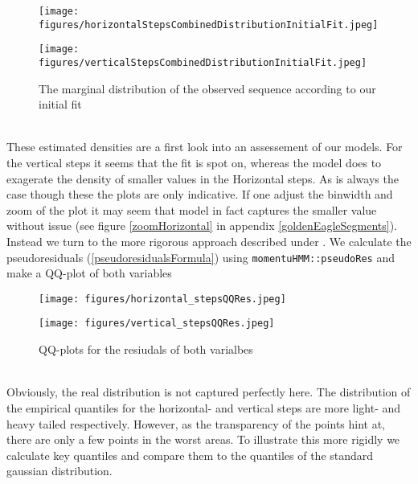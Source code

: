 \begin{figure}[h]
    \centering
    \begin{minipage}[b]{0.49\textwidth}
      \texttt{[image: figures/horizontalStepsCombinedDistributionInitialFit.jpeg]}
    \end{minipage}
    \hfill
    \begin{minipage}[b]{0.49\textwidth}
      \texttt{[image: figures/verticalStepsCombinedDistributionInitialFit.jpeg]}
    \end{minipage}
    \caption{The marginal distribution of the observed sequence according to our initial fit}
    \label{combinedDensityPlotsInitialFit}
\end{figure}\\
These estimated densities are a first look into an assessement of our models. For the vertical steps it seems that the fit is spot on, whereas the model does to exagerate the density of smaller values in the Horizontal steps. As is always the case though these the plots are only indicative. If one adjust the binwidth and zoom of the plot it may seem that model in fact captures the smaller value without issue (see figure \ref{zoomHorizontal} in appendix \ref{goldenEagleSegments}). Instead we turn to the more rigorous approach described under . We calculate the pseudoresiduals (\ref{pseudoresidualsFormula}) using \texttt{momentuHMM::pseudoRes} and make a QQ-plot of both variables
\begin{figure}[h]
    \centering
    \begin{minipage}[b]{0.49\textwidth}
      \texttt{[image: figures/horizontal\_stepsQQRes.jpeg]}
    \end{minipage}
    \hfill
    \begin{minipage}[b]{0.49\textwidth}
      \texttt{[image: figures/vertical\_stepsQQRes.jpeg]}
    \end{minipage}
    \caption{QQ-plots for the resiudals of both varialbes}
    \label{combinedQQPlots}
\end{figure}\\
Obviously, the real distribution is not captured perfectly here. The distribution of the empirical quantiles for the horizontal- and vertical steps are more light- and heavy tailed respectively. However, as the transparency of the points hint at, there are only a few points in the worst areas. To illustrate this more rigidly we calculate key quantiles and compare them to the quantiles of the standard gaussian distribution.
